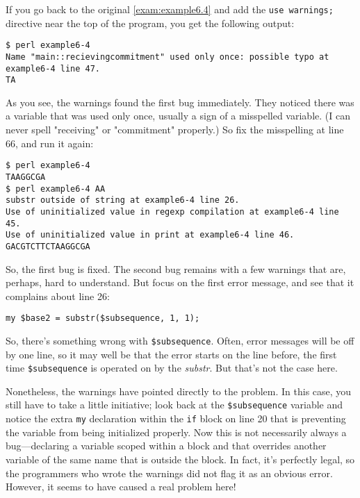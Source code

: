 If you go back to the original \autoref{exam:example6.4} and add the \verb|use warnings;| directive near the top of the program, you get the following output: 

\begin{lstlisting}
$ perl example6-4 
Name "main::recievingcommitment" used only once: possible typo at example6-4 line 47.
TA 
\end{lstlisting}

As you see, the warnings found the first bug immediately. They noticed there was a variable that was used only once, usually a sign of a misspelled variable. (I can never spell "receiving" or "commitment" properly.) So fix the misspelling at line 66, and run it again: 

\begin{lstlisting}
$ perl example6-4 
TAAGGCGA
$ perl example6-4 AA
substr outside of string at example6-4 line 26.
Use of uninitialized value in regexp compilation at example6-4 line 45.
Use of uninitialized value in print at example6-4 line 46.
GACGTCTTCTAAGGCGA   
\end{lstlisting}

So, the first bug is fixed. The second bug remains with a few warnings that are, perhaps, hard to understand. But focus on the first error message, and see that it complains about line 26:

\begin{lstlisting}
my $base2 = substr($subsequence, 1, 1);
\end{lstlisting}

So, there's something wrong with \verb|$subsequence|. Often, error messages will be off by one line, so it may well be that the error starts on the line before, the first time \verb|$subsequence| is operated on by the \textit{substr}. But that's not the case here.

Nonetheless, the warnings have pointed directly to the problem. In this case, you still have to take a little initiative; look back at the \verb|$subsequence| variable and notice the extra \verb|my| declaration within the \verb|if| block on line 20 that is preventing the variable from being initialized properly. Now this is not necessarily always a bug—declaring a variable scoped within a block and that overrides another variable of the same name that is outside the block. In fact, it's perfectly legal, so the programmers who wrote the warnings did not flag it as an obvious error. However, it seems to have caused a real problem here!

